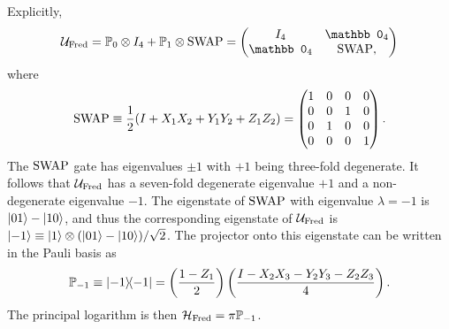 Explicitly,
\begin{equation}
    \UFred = \PP_0 \otimes I_4 + \PP_1 \otimes \on{SWAP} =
    \begin{pmatrix}
        I_4 & \mathbb0_4 \\
        \mathbb0_4 & \on{SWAP},
    \end{pmatrix}
\end{equation}
where
\begin{equation}
    \operatorname{SWAP} \equiv
    \frac{1}{2}(I + X_1 X_2 + Y_1 Y_2 + Z_1 Z_2) =
    \begin{pmatrix}
        1 & 0 & 0 & 0 \\
        0 & 0 & 1 & 0 \\
        0 & 1 & 0 & 0 \\
        0 & 0 & 0 & 1
    \end{pmatrix}.
\end{equation}
The $\operatorname{SWAP}$ gate has eigenvalues $\pm1$ with $+1$ being three-fold degenerate.
It follows that ${\mathcal{U}}_{\operatorname{Fred}}$ has a seven-fold degenerate eigenvalue $+1$ and a non-degenerate eigenvalue $-1$.
The eigenstate of $\operatorname{SWAP}$ with eigenvalue $\lambda=-1$ is $\ket{01}-\ket{10}$, and thus the corresponding eigenstate of ${\mathcal{U}}_{\operatorname{Fred}}$ is $\ket{-1}\equiv\ket1\otimes(\ket{01}-\ket{10})/\sqrt2$.
The projector onto this eigenstate can be written in the Pauli basis as
\begin{equation}
    \mathbb{P}_{-1}\equiv \ketbra{-1} =
    \left(\frac{1-Z_1}{2}\right)
    \left(\frac{I - X_2 X_3 - Y_2 Y_3 - Z_2 Z_3}{4}\right).
    \label{eq:GL:fredkin_projector_negeigspace}
\end{equation}
The principal logarithm is then ${\mathcal{H}}_{\operatorname{Fred}} = \pi\mathbb{P}_{-1}$.

